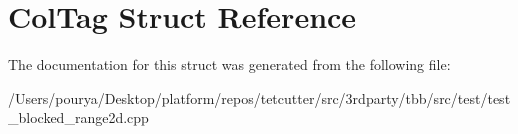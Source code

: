 \hypertarget{structColTag}{}\section{Col\+Tag Struct Reference}
\label{structColTag}


The documentation for this struct was generated from the following file\+:\begin{DoxyCompactItemize}
\item 
/\+Users/pourya/\+Desktop/platform/repos/tetcutter/src/3rdparty/tbb/src/test/test\+\_\+blocked\+\_\+range2d.\+cpp\end{DoxyCompactItemize}
